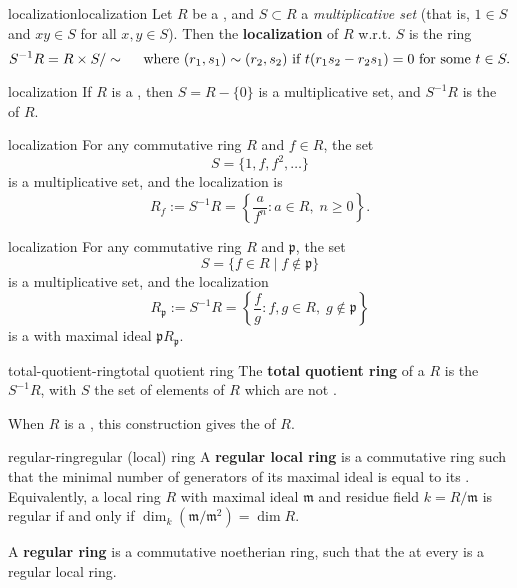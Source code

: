 \begin{topic}{localization}{localization}
    Let $R$ be a , and $S \subset R$ a \textit{multiplicative set} (that is, $1 \in S$ and $xy \in S$ for all $x, y \in S$). Then the \textbf{localization} of $R$ w.r.t. $S$ is the ring
    \[ S^{-1} R = R \times S / \sim{} \quad \textup{ where } (r_1, s_1) \sim{} (r_2, s_2) \textup{ if } t(r_1 s_2 - r_2 s_1) = 0 \textup{ for some } t \in S . \]
\end{topic}

\begin{example}{localization}
    If $R$ is a , then $S = R - \{ 0 \}$ is a multiplicative set, and $S^{-1} R$ is the  of $R$.
\end{example}

\begin{example}{localization}
    For any commutative ring $R$ and $f \in R$, the set
    \[ S = \{ 1, f, f^2, \ldots \} \]
    is a multiplicative set, and the localization is
    \[ R_f := S^{-1} R = \left\{ \frac{a}{f^n} : a \in R, \; n \ge 0 \right\} . \]
\end{example}

\begin{example}{localization}
    For any commutative ring $R$ and  $\mathfrak{p}$, the set
    \[ S = \{ f \in R \mid f \not\in \mathfrak{p} \} \]
    is a multiplicative set, and the localization
    \[ R_\mathfrak{p} := S^{-1} R = \left\{ \frac{f}{g} : f, g \in R, \; g \not\in \mathfrak{p} \right\} \]
    is a  with maximal ideal $\mathfrak{p} R_\mathfrak{p}$.
\end{example}

\begin{topic}{total-quotient-ring}{total quotient ring}
    The \textbf{total quotient ring} of a  $R$ is the  $S^{-1} R$, with $S$ the set of elements of $R$ which are not .
    
    When $R$ is a , this construction gives the  of $R$.
\end{topic}

\begin{topic}{regular-ring}{regular (local) ring}
    A \textbf{regular local ring} is a commutative   ring such that the minimal number of generators of its maximal ideal is equal to its . Equivalently, a local ring $R$ with maximal ideal $\mathfrak{m}$ and residue field $k = R / \mathfrak{m}$ is regular if and only if $\dim_k(\mathfrak{m} / \mathfrak{m}^2) = \dim R$.
    
    A \textbf{regular ring} is a commutative noetherian ring, such that the  at every  is a regular local ring.
\end{topic}

